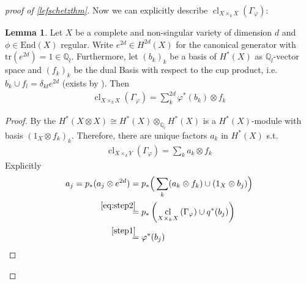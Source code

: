 \documentclass[english]{scrartcl}
\theoremstyle{definition}
\newtheorem{Lem}[Def]{Lemma}
\theoremstyle{remark}
\newcommand*{\Z}{\mathds{Z}}
\newcommand*{\Q}{\mathds{Q}}
\newcommand*{\Zl}{\Z_l} %
\newcommand*{\Ql}{\Q_l} %
\newcommand*{\End}[1]{\text{End}(#1)} %
\newcommand*{\idest}{i.e.\ }
\newcommand*{\Tr}{\text{tr}} %
\newcommand*{\tr}[1]{\Tr\left(#1\right)} %
\newcommand*{\Graph}[1]{{\Gamma_{#1}}} %
\DeclareMathOperator{\CL}{cl} %
\newcommand*{\cl}[2]{{\CL_{#1}\left(#2\right)}} %
\newcommand*{\one}[1]{{1_{#1}}}%
\let\altphi\phi
\renewcommand*{\phi}{\varphi}
\begin{document}
\begin{proof}[proof of \autoref{lefschetzthm}]
    Now we can explicitly describe
    $\cl{X\times_k X}{\Graph{\phi}}$:
    \begin{Lem}\label{clofgraph}
      Let $X$ be a complete and non-singular variety of dimension $d$
      and $\altphi\in\End{X}$ regular.
      Write $e^{2d}\in H^{2d}(X)$ for the canonical generator
      with $\tr{e^{2d}}=1\in\Ql$.
      Furthermore, let $(b_k)_k$ be a basis of $H^*(X)$ as
      $\Ql$-vector space and $(f_k)_k$ be the dual Basis with respect
      to the cup product, \idest $b_k\cup f_l=\delta_{kl}e^{2d}$
      (exists by ).
      Then
      \begin{gather*}
        \cl{X\times_k X}{\Graph{\phi}} =
        \sum_{k}^{2d} \phi^*(b_k)\otimes  f_k
      \end{gather*}
      \begin{proof}
        By the  %
        $H^*(X\otimes X) \cong H^*(X)\otimes_{\Ql}H^*(X)$ is a
        $H^*(X)$-module with basis
        $(\one{X}\otimes f_k)_{k}$.
        Therefore, there are unique factors $a_{k}$ in $H^*(X)$ s.t.
        \begin{gather}
          \label{eq:step2}
          \cl{X\times_k Y}{\Graph{\phi}} =
          \sum_{k} a_k\otimes f_k
        \end{gather}
        Explicitly
        \begin{align*}
          a_j
          = p_*(a_j\otimes e^{2d})
          &= p_*\Big(
            \sum_k(a_k\otimes f_k)\cup (\one{X}\otimes b_j)
            \Big)\\
          &\overset{\mathllap{\eqref{eq:step2}}}= p_*\left(
            \cl{X\times_k X}{\Graph{\phi}} \cup q^*(b_j)
            \right)\\
          &\overset{\mathllap{\ref{step1}}}= \phi^*(b_j) 
        \end{align*}
      \end{proof}
    \end{Lem}


\end{proof}
\end{document}

